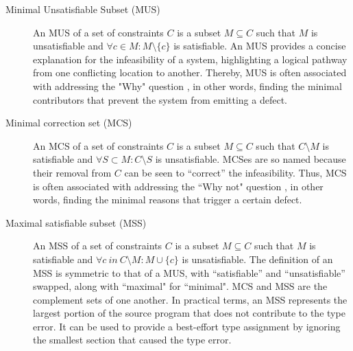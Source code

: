\documentclass[pdflatex,lineno,sn-nature,Numbered]{sn-jnl}%
\begin{document}
\begin{description}
\item[Minimal Unsatisfiable Subset (MUS)] An MUS of a set of constraints $C$ is a subset $M \subseteq C$ such that $M$ is unsatisfiable and $ \forall{c} \in M : M \setminus \{c\}$ is satisfiable. An MUS provides a concise explanation for the infeasibility of a system, highlighting a logical pathway from one conflicting location to another. Thereby, MUS is often associated with addressing the "Why" question \cite{Ignatiev2020-xu, Nelson2017-ar}, in other words, finding the minimal contributors that prevent the system from emitting a defect.
    
\item[Minimal correction set (MCS)] An MCS of a set of constraints $C$ is a subset $M \subseteq C$ such that $C \setminus M$ is satisfiable and $\forall{S} \subset M : C \setminus S$ is unsatisfiable. MCSes are so named because their removal from $C$ can be seen to “correct” the infeasibility. Thus, MCS is often associated with addressing the ``Why not" question \cite{Ignatiev2020-xu, Nelson2017-ar}, in other words, finding the minimal reasons that trigger a certain defect. 


\item[Maximal satisfiable subset (MSS)] An MSS of a set of constraints $C$ is a subset $M \subseteq C$ such that $M$ is satisfiable and $\forall{c}\ in\ C \setminus M:M\cup\{c\}$ is unsatisfiable. The definition of an MSS is symmetric to that of a MUS, with “satisfiable” and “unsatisfiable” swapped, along with ``maximal" for ``minimal". MCS and MSS are the complement sets of one another. In practical terms, an MSS represents the largest portion of the source program that does not contribute to the type error. It can be used to provide a best-effort type assignment by ignoring the smallest section that caused the type error. 
\end{description}
\end{document}

